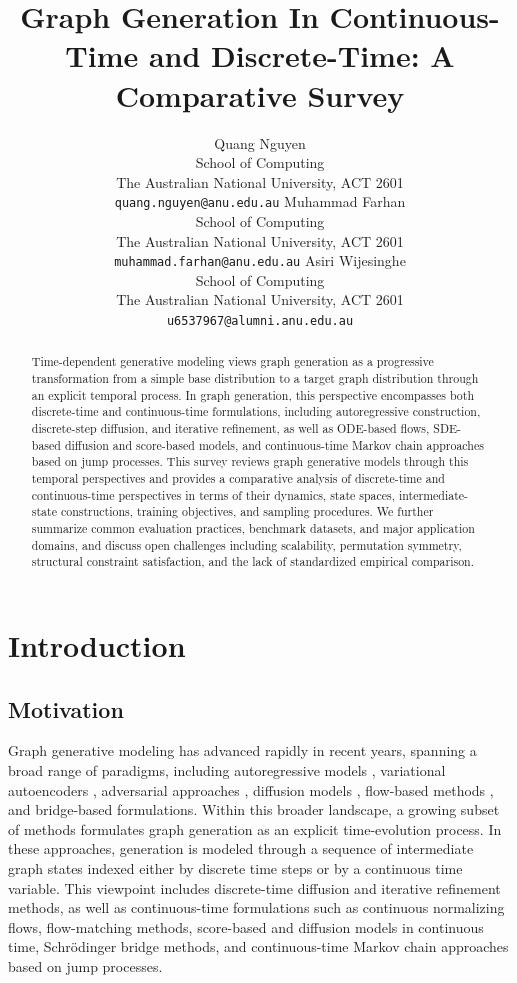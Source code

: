 \documentclass{article}
\title{Graph Generation In Continuous-Time and Discrete-Time: A Comparative Survey}
\author{
  Quang Nguyen \\
  School of Computing\\
  The Australian National University, ACT 2601 \\
  \texttt{quang.nguyen@anu.edu.au}
  \And
  Muhammad Farhan \\
  School of Computing\\
  The Australian National University, ACT 2601 \\
  \texttt{muhammad.farhan@anu.edu.au}
  \And
  Asiri Wijesinghe \\
  School of Computing\\
  The Australian National University, ACT 2601 \\
  \texttt{u6537967@alumni.anu.edu.au}
}
\begin{document}
\maketitle
\begin{abstract}
Time-dependent generative modeling views graph generation as a progressive transformation from a simple base distribution to a target graph distribution through an explicit temporal process. In graph generation, this perspective encompasses both discrete-time and continuous-time formulations, including autoregressive construction, discrete-step diffusion, and iterative refinement, as well as ODE-based flows, SDE-based diffusion and score-based models, and continuous-time Markov chain approaches based on jump processes. This survey reviews graph generative models through this temporal perspectives and provides a comparative analysis of discrete-time and continuous-time perspectives in terms of their dynamics, state spaces, intermediate-state constructions, training objectives, and sampling procedures. We further summarize common evaluation practices, benchmark datasets, and major application domains, and discuss open challenges including scalability, permutation symmetry, structural constraint satisfaction, and the lack of standardized empirical comparison.
\end{abstract}



\section{Introduction}
\label{sec:intro}

\subsection{Motivation}
\label{sec:motivation}

Graph generative modeling has advanced rapidly in recent years, spanning a broad range of paradigms, including autoregressive models \cite{uria2016nade}, variational autoencoders \cite{kingma2014vae}, adversarial approaches \cite{goodfellow2014gan}, diffusion models \cite{ho2020ddpm}, flow-based methods \cite{lipman2023flowmatching}, and bridge-based \cite{debortoli2021dsb} formulations. Within this broader landscape, a growing subset of methods formulates graph generation as an explicit time-evolution process. In these approaches, generation is modeled through a sequence of intermediate graph states indexed either by discrete time steps or by a continuous time variable. This viewpoint includes discrete-time diffusion and iterative refinement methods, as well as continuous-time formulations such as continuous normalizing flows, flow-matching methods, score-based and diffusion models in continuous time, Schr\"odinger bridge methods, and continuous-time Markov chain approaches based on jump processes.
\end{document}
